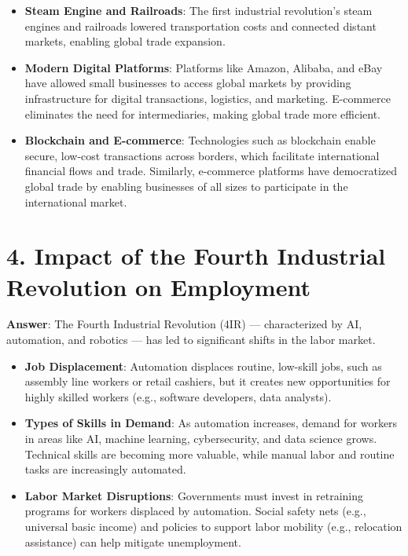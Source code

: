 \documentclass{article}
\begin{document}
\begin{itemize}
    \item \textbf{Steam Engine and Railroads}:  
    The first industrial revolution's steam engines and railroads lowered transportation costs and connected distant markets, enabling global trade expansion.
    
    \item \textbf{Modern Digital Platforms}:  
    Platforms like Amazon, Alibaba, and eBay have allowed small businesses to access global markets by providing infrastructure for digital transactions, logistics, and marketing. E-commerce eliminates the need for intermediaries, making global trade more efficient.
    
    \item \textbf{Blockchain and E-commerce}:  
    Technologies such as blockchain enable secure, low-cost transactions across borders, which facilitate international financial flows and trade. Similarly, e-commerce platforms have democratized global trade by enabling businesses of all sizes to participate in the international market.
\end{itemize}

\section*{4. Impact of the Fourth Industrial Revolution on Employment}
\textbf{Answer}:  
The Fourth Industrial Revolution (4IR) — characterized by AI, automation, and robotics — has led to significant shifts in the labor market.

\begin{itemize}
    \item \textbf{Job Displacement}:  
    Automation displaces routine, low-skill jobs, such as assembly line workers or retail cashiers, but it creates new opportunities for highly skilled workers (e.g., software developers, data analysts).
    
    \item \textbf{Types of Skills in Demand}:  
    As automation increases, demand for workers in areas like AI, machine learning, cybersecurity, and data science grows. Technical skills are becoming more valuable, while manual labor and routine tasks are increasingly automated.
    
    \item \textbf{Labor Market Disruptions}:  
    Governments must invest in retraining programs for workers displaced by automation. Social safety nets (e.g., universal basic income) and policies to support labor mobility (e.g., relocation assistance) can help mitigate unemployment.
\end{itemize}
\end{document}
